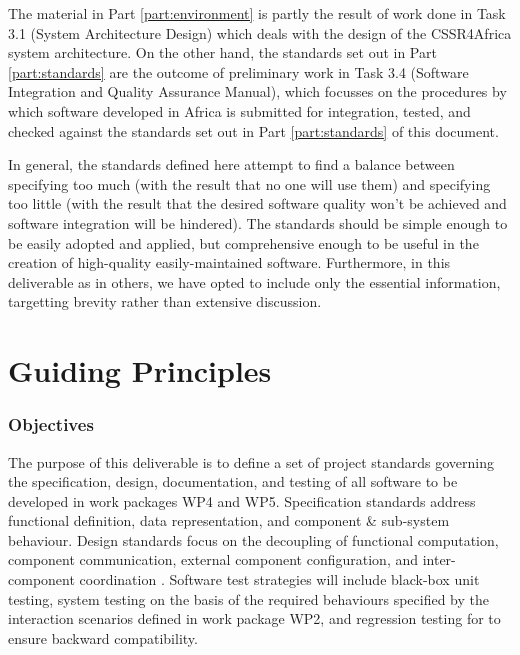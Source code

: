 \documentclass{CSSRforAfrica}
\begin{document}
The material in Part \ref{part:environment} is partly the result of work done in Task 3.1 (System Architecture Design) which deals with the design of the CSSR4Africa system architecture.  On the other hand, the standards set out in Part \ref{part:standards} are the outcome of preliminary work in Task 3.4 (Software Integration and Quality Assurance Manual),   which focusses on the procedures by which software developed in Africa is submitted for integration, tested, and checked against the standards set out in Part \ref{part:standards} of this document.

In general, the standards defined here attempt to find a balance between specifying too much (with the result that no one will use them) and specifying too little (with the result that the desired software quality won't be achieved and software integration will be hindered).   The standards should be simple enough to be easily adopted and applied,  but  comprehensive enough to be useful in the creation of high-quality easily-maintained software.   Furthermore, in this deliverable as in others, we have opted to include only the essential information, targetting brevity rather than extensive discussion.


\newpage
 
 
\pagebreak
\tableofcontents
\newpage




\newpage
\part{Guiding Principles}
\label{part:principles}
 


\section{Objectives}

The purpose of this deliverable is to define a set of project standards governing the specification, design, documentation, and testing of all software to be developed in work packages WP4 and WP5.
Specification standards  address functional definition, data representation, and component \& sub-system behaviour. 
Design standards  focus on the decoupling of functional computation, component communication, external component configuration, and inter-component coordination \cite{RadestrockEisenbach96}. 
Software test strategies will include black-box unit testing, system testing on the basis of the required behaviours specified by the interaction scenarios defined in work package WP2, and regression testing for to ensure backward compatibility. 
\end{document}
